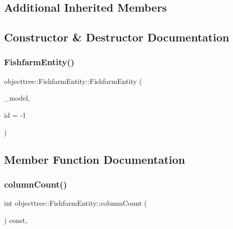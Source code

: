 \subsection*{Additional Inherited Members}


\subsection{Constructor \& Destructor Documentation}
\mbox{\label{classobjecttree_1_1_fishfarm_entity_abf0ac49ff929ea830297b97ce693524d}} 
\subsubsection{\texorpdfstring{FishfarmEntity()}{FishfarmEntity()}}
{\footnotesize\ttfamily objecttree\+::\+Fishfarm\+Entity\+::\+Fishfarm\+Entity (\begin{DoxyParamCaption}\item[{\mbox{\hyperlink{class_object_tree_model}{Object\+Tree\+Model}} $\ast$}]{\+\_\+model,  }\item[{int}]{id = {\ttfamily -\/1} }\end{DoxyParamCaption})}



\subsection{Member Function Documentation}
\mbox{\label{classobjecttree_1_1_fishfarm_entity_abdf6e1d8d17681f4400594fa97d0ee98}} 
\subsubsection{\texorpdfstring{columnCount()}{columnCount()}}
{\footnotesize\ttfamily int objecttree\+::\+Fishfarm\+Entity\+::column\+Count (\begin{DoxyParamCaption}{ }\end{DoxyParamCaption}) const\hspace{0.3cm}{\ttfamily [override]}, {\ttfamily [virtual]}}



